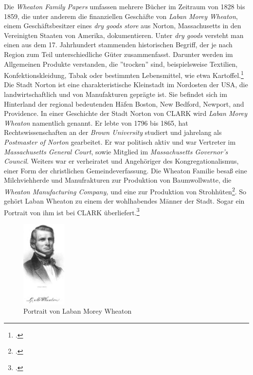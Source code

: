 \documentclass[12pt,a4paper]{article}
\begin{document}
Die \textit{Wheaton Family Papers} umfassen mehrere Bücher im Zeitraum von 1828 bis 1859, die unter anderem die finanziellen Geschäfte von \textit{Laban Morey Wheaton}, einem Geschäftsbesitzer eines \textit{dry goods store} aus Norton, Massachusetts in den Vereinigten Staaten von Amerika, dokumentieren. Unter \textit{dry goods} versteht man einen aus dem 17. Jahrhundert stammenden historischen Begriff, der je nach Region zum Teil unterschiedliche Güter zusammenfasst. Darunter werden im Allgemeinen Produkte verstanden, die ''trocken'' sind, beispielsweise Textilien, Konfektionskleidung, Tabak oder bestimmten Lebensmittel, wie etwa Kartoffel.\footcite[Definition von \textit{Dry Goods}, \protect\url{https://chestofbooks.com/reference/Dictionary-of-Dry-Goods/Dry-Goods.html}, 23.05.2019, Vgl.][]{cole2015complete}
\\
Die Stadt Norton ist eine charakteristische Kleinstadt im Nordosten der USA, die landwirtschaftlich und von Manufakturen geprägte ist. Sie befindet sich im Hinterland der regional bedeutenden Häfen Boston, New Bedford, Newport, and Providence. In einer Geschichte der Stadt Norton von CLARK wird \textit{Laban Morey Wheaton} namentlich genannt. Er lebte von 1796 bis 1865, hat Rechtswissenschaften an der \textit{Brown University} studiert und jahrelang als \textit{Postmaster of Norton} gearbeitet. Er war politisch aktiv und war Vertreter im \textit{Massachusetts General Court}, sowie Mitglied im \textit{Massachusetts Governor's Council}. Weiters war er verheiratet und Angehöriger des Kongregationalismus, einer Form der christlichen Gemeindeverfassung. Die Wheaton Familie besaß eine Milchviehherde und Manufrakturen zur Produktion von Baumwollwatte, die \textit{Wheaton Manufacturing Company,} und eine zur Produktion von Strohhüten\footcite[][S.6]{tomasek2013encoding}. So gehört Laban Wheaton zu einem der wohlhabendes Männer der Stadt. Sogar ein Portrait von ihm ist bei CLARK überliefert.\footcite[][S.496]{clark1859history} 
\begin{figure}[H]
\centering
	\includegraphics[width=0.2\textwidth]{img/LMwheaton.jpg}  
    \caption[Portrait von Laban Morey Wheaton, Vgl. CLARK, George Faber: A History of the Town of Norton, Bristol County, Massachusetts, from 1669-1859.
Crosby, Nichols, and Company, and author at Norton, 1859, S.497.]{Portrait von Laban Morey Wheaton} \label{fig:LMwheaton}
\end{figure} 
\end{document}

